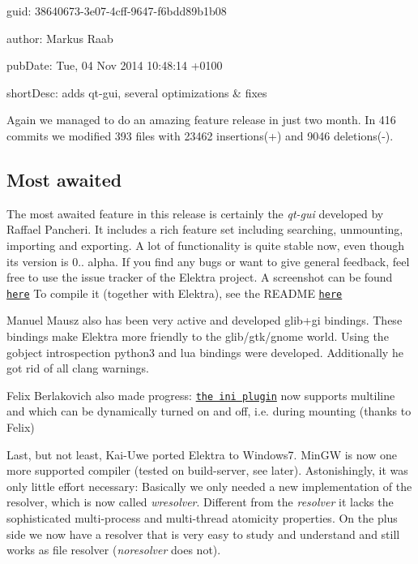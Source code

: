 
\begin{DoxyItemize}
\item guid\+: 38640673-\/3e07-\/4cff-\/9647-\/f6bdd89b1b08
\item author\+: Markus Raab
\item pub\+Date\+: Tue, 04 Nov 2014 10\+:48\+:14 +0100
\item short\+Desc\+: adds qt-\/gui, several optimizations \& fixes
\end{DoxyItemize}

Again we managed to do an amazing feature release in just two month. In 416 commits we modified 393 files with 23462 insertions(+) and 9046 deletions(-\/).

\subsection*{Most awaited}

The most awaited feature in this release is certainly the {\itshape qt-\/gui} developed by Raffael Pancheri. It includes a rich feature set including searching, unmounting, importing and exporting. A lot of functionality is quite stable now, even though its version is 0.. alpha. If you find any bugs or want to give general feedback, feel free to use the issue tracker of the Elektra project. A screenshot can be found \href{https://github.com/ElektraInitiative/libelektra/blob/master/doc/images/screenshot-qt-gui.png}{\tt here} To compile it (together with Elektra), see the R\+E\+A\+D\+ME \href{https://github.com/ElektraInitiative/libelektra/tree/master/src/tools/qt-gui}{\tt here}

Manuel Mausz also has been very active and developed glib+gi bindings. These bindings make Elektra more friendly to the glib/gtk/gnome world. Using the gobject introspection python3 and lua bindings were developed. Additionally he got rid of all clang warnings.

Felix Berlakovich also made progress\+: \href{https://github.com/ElektraInitiative/libelektra/tree/master/src/plugins/ini}{\tt the ini plugin} now supports multiline and which can be dynamically turned on and off, i.\+e. during mounting (thanks to Felix)

Last, but not least, Kai-\/\+Uwe ported Elektra to Windows7. Min\+GW is now one more supported compiler (tested on build-\/server, see later). Astonishingly, it was only little effort necessary\+: Basically we only needed a new implementation of the resolver, which is now called {\itshape wresolver}. Different from the {\itshape resolver} it lacks the sophisticated multi-\/process and multi-\/thread atomicity properties. On the plus side we now have a resolver that is very easy to study and understand and still works as file resolver ({\itshape noresolver} does not).

